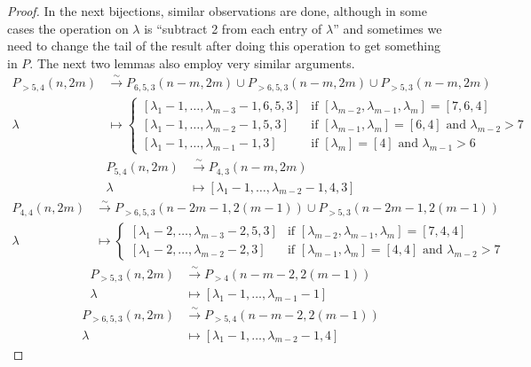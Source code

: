 \documentclass[12pt,a4paper]{article}
\begin{document}
\begin{proof}
  In the next bijections, similar observations are done, although in some cases the operation on $\lambda$ is ``subtract 2 from each entry of $\lambda$'' and sometimes we need to change the tail of the result after doing this operation to get something in $P$.
  The next two lemmas also employ very similar arguments.
  \begin{align*}
    P_{>5,4}(n,2m)&\xrightarrow{\sim} P_{6, 5, 3}(n-m,2m)\cup P_{>6, 5, 3}(n-m,2m)\cup P_{>5, 3}(n-m,2m) \\
    \lambda&\mapsto
             \begin{cases}
               [\lambda_1-1, \dots, \lambda_{m-3}-1, 6, 5, 3] & \text{if } [\lambda_{m-2},\lambda_{m-1}, \lambda_m]=[7, 6, 4] \\
               [\lambda_1-1, \dots, \lambda_{m-2}-1, 5, 3] & \text{if } [\lambda_{m-1},\lambda_m]=[6, 4]\text{ and } \lambda_{m-2}>7 \\
               [\lambda_1-1, \dots, \lambda_{m-1}-1, 3] & \text{if } [\lambda_m]=[4] \text{ and } \lambda_{m-1}>6
             \end{cases}
  \end{align*}
  \begin{align*}
    P_{5, 4}(n,2m)&\xrightarrow{\sim} P_{4, 3}(n-m,2m) \\
    \lambda&\mapsto [\lambda_1-1, \dots, \lambda_{m-2}-1, 4, 3]
  \end{align*}
  \begin{align*}
    P_{4, 4}(n,2m)&\xrightarrow{\sim} P_{>6, 5, 3}(n-2m-1,2(m-1))\cup P_{>5, 3}(n-2m-1,2(m-1)) \\
    \lambda&\mapsto
             \begin{cases}
               [\lambda_1-2, \dots, \lambda_{m-3}-2, 5, 3] & \text{if } [\lambda_{m-2},\lambda_{m-1}, \lambda_m]=[7, 4, 4] \\
               [\lambda_1-2, \dots, \lambda_{m-2}-2, 3] & \text{if } [\lambda_{m-1},\lambda_m]=[4, 4]\text{ and } \lambda_{m-2}>7
             \end{cases}
  \end{align*}
  \begin{align*}
    P_{>5, 3}(n,2m)&\xrightarrow{\sim} P_{>4}(n-m-2,2(m-1)) \\
    \lambda&\mapsto [\lambda_1-1, \dots, \lambda_{m-1}-1]
  \end{align*}
  \begin{align*}
    P_{>6,5,3}(n,2m)&\xrightarrow{\sim} P_{>5,4}(n-m-2,2(m-1)) \\
    \lambda&\mapsto [\lambda_1-1, \dots, \lambda_{m-2}-1,4]

\end{align*}
\end{proof}
\end{document}
